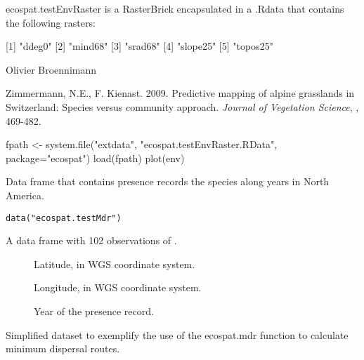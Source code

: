 \documentclass[a4paper]{book}
\begin{document}
%
\begin{Format}
ecospat.testEnvRaster is a RasterBrick encapsulated in a .Rdata that contains the following rasters:

[1] "ddeg0"       
[2] "mind68"      
[3] "srad68"      
[4] "slope25"            
[5] "topos25"
\end{Format}
%
\begin{Author}\relax
Olivier Broennimann 

\end{Author}
%
\begin{References}\relax
Zimmermann, N.E., F. Kienast. 2009. Predictive mapping of alpine grasslands in Switzerland: Species versus community approach. \emph{Journal of Vegetation Science}, , 469-482.
\end{References}
%
\begin{Examples}
\begin{ExampleCode}
fpath <- system.file("extdata", "ecospat.testEnvRaster.RData", package="ecospat")
load(fpath)
plot(env)
\end{ExampleCode}
\end{Examples}
%
\begin{Description}\relax
Data frame that contains presence records the species  along years in North America.
\end{Description}
%
\begin{Usage}
\begin{verbatim}
data("ecospat.testMdr")
\end{verbatim}
\end{Usage}
%
\begin{Format}
A data frame with 102 observations of .
\begin{description}

\item[] Latitude, in WGS coordinate system.
\item[] Longitude, in WGS coordinate system.
\item[] Year of the presence record.

\end{description}

\end{Format}
%
\begin{Details}\relax
Simplified dataset to exemplify the use of the ecospat.mdr function to calculate minimum dispersal routes.
\end{Details}
\end{document}
